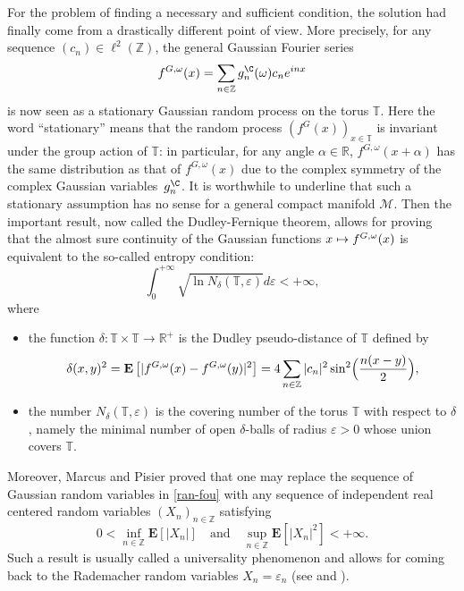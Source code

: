 \documentclass[10pt]{amsart}
\def\mto{\mathchoice{\longmapsto}{\mapsto}{\mapsto}{\mapsto}}
\theoremstyle{theorem}
\theoremstyle{definition}
\newcommand\R{\mathbb{R}}
\newcommand\E{\mathbf{E}}
\newcommand\Z{\mathbb{Z}}
\newcommand\T{\mathbb{T}}
\newcommand\ep{\varepsilon}
\begin{document}
For the problem of finding a necessary and sufficient condition, the solution had finally come from a drastically different point of view. More precisely, for any sequence $(c_n)\in \ell^2(\Z)$, the general Gaussian Fourier series
\begin{equation}\label{ran-fou}
f^{G,\omega}(x)=\sum_{n\in \Z} g_n^{\C}(\omega) c_n e^{inx}
\end{equation}
is now seen as a stationary Gaussian random process on the torus $\mathbb{T}$.
Here the word ``stationary'' means that the random process $(f^{G}(x))_{x\in \mathbb{T}}$ is invariant under the group action of $\mathbb{T}$: in particular, for any angle $\alpha \in \R$, $f^{G,\omega}(x+\alpha)$ has the same distribution as that of $f^{G,\omega}(x)$ due to the complex symmetry of the complex Gaussian variables~$g_n^\C$.
It is worthwhile to underline that such a stationary assumption has no sense for a general compact manifold $\mathcal{M}$.
Then the important result, now called the Dudley-Fernique theorem, allows for proving that the almost sure continuity of the Gaussian functions
$x\mto f^{G,\omega}(x)$ is equivalent to the so-called entropy condition:
\begin{equation}\label{entrop}
\int_{0}^{+\infty} \sqrt{\ln N_{\delta}(\T,\ep)} d\ep<+\infty,
\end{equation}
\enlargethispage{-2\baselineskip}%
where
\begin{itemize}
\item the function $\delta:\mathbb{T}\times \mathbb{T}\to \R^+$ is the Dudley pseudo-distance of $\mathbb{T}$ defined by\vspace*{-3pt}
\begin{equation*}
\delta(x,y)^2 =\E\left[| f^{G,\omega}(x)-f^{G,\omega}(y)|^2\right]=4\sum_{n\in \Z} |c_n|^2 \sin^2\Bigl(\frac{n(x-y)}{2}\Bigr),
\end{equation*}
\item the number $N_{\delta}(\T,\ep)$ is the covering number of the torus $\mathbb{T}$ with respect to $\delta$, namely the minimal number of open $\delta$-balls of radius $\ep>0$ whose union covers $\mathbb{T}$.
\end{itemize}
Moreover, Marcus and Pisier proved that one may replace the sequence of Gaussian random variables in \eqref{ran-fou} with any sequence of independent real centered random variables $(X_n)_{n\in \Z}$ satisfying\vspace*{-3pt}
\begin{equation*}
0<\inf_{n\in \Z}\E[|X_n|] \quad \text{and} \quad \sup_{n\in \Z} \E[|X_n|^2]<+\infty.
\end{equation*}
Such a result is usually called a universality phenomenon and allows for coming back to the Rademacher random variables $X_n=\ep_n$ (see \cite[p.\,7--9]{pisier1981} and \cite[p.\,28, Cor.\,7.3]{pisier1977}).
\end{document}
